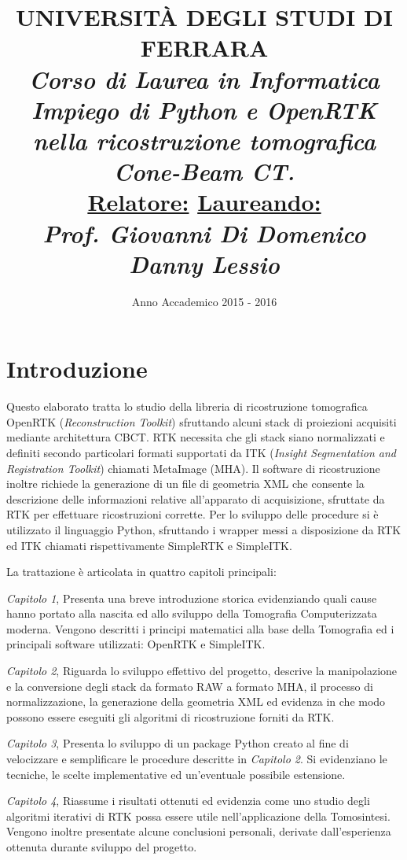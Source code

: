 \documentclass[a4paper,12pt, doubleside]{report}
\title{\textbf{UNIVERSITÀ DEGLI STUDI DI FERRARA\\}
\bigskip
\textit{Corso di Laurea in Informatica}\\
\bigskip
\bigskip
\bigskip
\bigskip
\bigskip
\bigskip
\bigskip
\bigskip
\bigskip
\bigskip
\bigskip
\bigskip
\bigskip
\bigskip
\bigskip
\bigskip
\textit{\textbf{Impiego di Python e OpenRTK nella ricostruzione tomografica Cone-Beam CT.\\}}
\bigskip
\bigskip
\bigskip
\bigskip
\bigskip
\bigskip
\bigskip
\bigskip
\bigskip
\bigskip
\bigskip
\bigskip
\bigskip
\bigskip
\bigskip
\bigskip
\bigskip
\bigskip
\bigskip
\bigskip
\bigskip
\textbf{\underline{Relatore:}}
\hfill
\textbf{\underline{Laureando:}\thinspace\thinspace\thinspace} \\
\textit{Prof. Giovanni Di Domenico}
\hfill
\textit{Danny Lessio}
\bigskip
\bigskip
\bigskip
\bigskip
\bigskip
\bigskip
\bigskip
\bigskip
\bigskip
}
\date{Anno Accademico 2015 - 2016}
\begin{document}
    \maketitle
    \newpage

    \chapter*{Introduzione}
        \par
            Questo elaborato tratta lo studio della libreria di ricostruzione tomografica OpenRTK (\textit{Reconstruction Toolkit}) sfruttando alcuni stack di proiezioni acquisiti mediante architettura CBCT. RTK necessita che gli stack siano normalizzati e definiti secondo particolari formati supportati da ITK (\textit{Insight Segmentation and Registration Toolkit}) chiamati MetaImage (MHA). Il software di ricostruzione inoltre richiede la generazione di un file di geometria XML che consente la descrizione delle informazioni relative all'apparato di acquisizione, sfruttate da RTK per effettuare ricostruzioni corrette. Per lo sviluppo delle procedure si è utilizzato il linguaggio Python, sfruttando i wrapper messi a disposizione da RTK ed ITK chiamati rispettivamente SimpleRTK e SimpleITK.
            
        \bigskip
        \bigskip
        \par
            La trattazione è articolata in quattro capitoli principali:
        \bigskip
        \par
            \textit{Capitolo 1}, Presenta una breve introduzione storica evidenziando quali cause hanno portato alla nascita ed allo sviluppo della Tomografia Computerizzata moderna. Vengono descritti i principi matematici alla base della Tomografia ed i principali software utilizzati: OpenRTK e SimpleITK.
        \bigskip
        \par            
            \textit{Capitolo 2}, Riguarda lo sviluppo effettivo del progetto, descrive la manipolazione e la conversione degli stack da formato RAW a formato MHA, il processo di normalizzazione, la generazione della geometria XML ed evidenza in che modo possono essere eseguiti gli algoritmi di ricostruzione forniti da RTK.
        \bigskip
        \par            
            \textit{Capitolo 3}, Presenta lo sviluppo di un package Python creato al fine di velocizzare e semplificare le procedure descritte in \textit{Capitolo 2}. Si evidenziano le tecniche, le scelte implementative ed un'eventuale possibile estensione.
        \bigskip
        \par            
            \textit{Capitolo 4}, Riassume i risultati ottenuti ed evidenzia come uno studio degli algoritmi iterativi di RTK possa essere utile nell'applicazione della Tomosintesi. Vengono inoltre presentate alcune conclusioni personali, derivate dall'esperienza ottenuta durante sviluppo del progetto.
            
\end{document}
